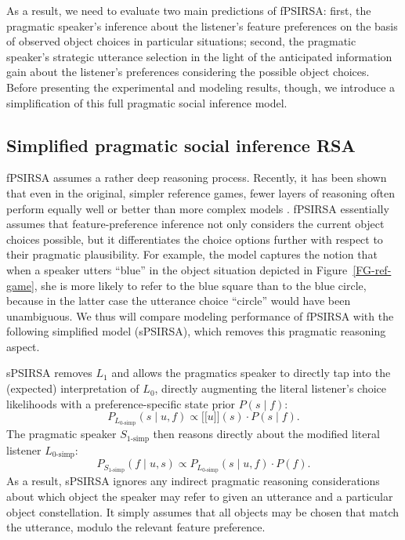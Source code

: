\documentclass[10pt,a4paper]{article}
\newcommand{\sem}[1]{\mbox{$[\![$#1$]\!]$}}
\begin{document}
As a result, we need to evaluate two main predictions of fPSIRSA: 
first, the pragmatic speaker's inference about the listener's feature preferences on the basis of observed object choices in particular situations; 
second, the pragmatic speaker's strategic utterance selection in the light of the anticipated information gain about the listener's preferences considering the possible object choices.
Before presenting the experimental and modeling results, though, we introduce a simplification of this full pragmatic social inference model. 


\subsection{Simplified pragmatic social inference RSA}
fPSIRSA assumes a rather deep reasoning process. 
Recently, it has been shown that even in the original, simpler reference games, fewer layers of reasoning often perform equally well or better than more complex models \cite{sikos2019}.
fPSIRSA essentially assumes that feature-preference inference not only considers the current object choices possible, but it differentiates the choice options further with respect to their pragmatic plausibility. 
For example, the model captures the notion that when a speaker utters ``blue'' in the object situation depicted in Figure~\ref{FG-ref-game}, she is more likely to refer to the blue square than to the blue circle, because in the latter case the utterance choice ``circle'' would have been unambiguous. 
We thus will compare modeling performance of fPSIRSA with the following simplified model (sPSIRSA), which removes this pragmatic reasoning aspect.


sPSIRSA removes $L_1$ and allows the pragmatics speaker to directly tap into the (expected) interpretation of $L_0$, directly augmenting the literal listener's choice likelihoods with a preference-specific state prior $P(s\mid f)$:
$$P_{L_{0\textrm{-simp}}}(s\mid u,f) \propto \sem{$u$}(s) \cdot P(s\mid f).$$
The pragmatic speaker $S_{1\textrm{-simp}}$ then reasons directly about the modified literal listener $L_{0\textrm{-simp}}$: 
$$P_{S_{1\textrm{-simp}}}(f\mid u,s) \propto P_{L_{0\textrm{-simp}}}(s\mid u,f) \cdot P(f).$$
As a result, sPSIRSA ignores any indirect pragmatic reasoning considerations about which object the speaker may refer to given an utterance and a particular object constellation.
It simply assumes that all objects may be chosen that match the utterance, modulo the relevant feature preference.
\end{document}
